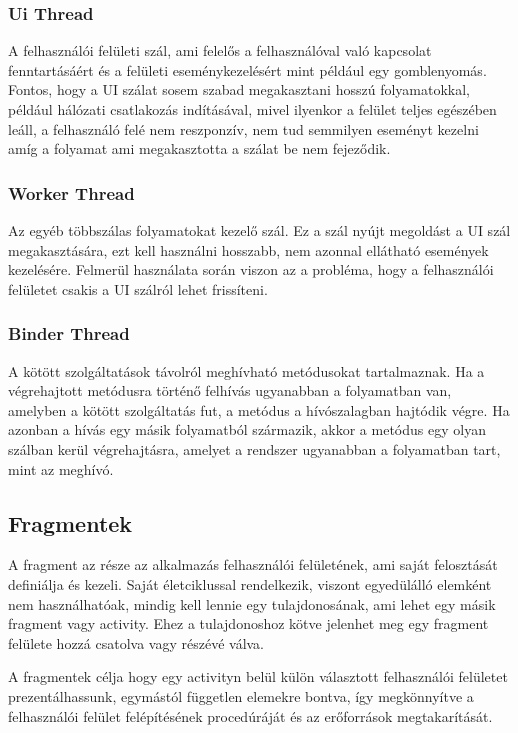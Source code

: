 \documentclass[
]{thesis-ekf}
\theoremstyle{definition}
\theoremstyle{remark}
\begin{document}
\subsubsection{Ui Thread}
A felhasználói felületi szál, ami felelős a felhasználóval való kapcsolat fenntartásáért 
és a felületi eseménykezelésért mint például egy gomblenyomás. Fontos, 
hogy a UI szálat sosem szabad megakasztani hosszú folyamatokkal, 
például hálózati csatlakozás indításával, mivel ilyenkor a felület teljes egészében leáll, 
a felhasználó felé nem reszponzív, nem tud semmilyen eseményt kezelni 
amíg a folyamat ami megakasztotta a szálat be nem fejeződik.
	
\subsubsection{Worker Thread}
Az egyéb többszálas folyamatokat kezelő szál. Ez a szál nyújt megoldást a UI szál megakasztására,
ezt kell használni hosszabb, nem azonnal ellátható események kezelésére. Felmerül használata során viszon az a
probléma, hogy a felhasználói felületet csakis a UI szálról lehet frissíteni. 
	
\subsubsection{Binder Thread}
A kötött szolgáltatások távolról meghívható metódusokat tartalmaznak. Ha a végrehajtott metódusra történő felhívás ugyanabban a folyamatban van, amelyben a kötött szolgáltatás fut, a metódus a hívószalagban hajtódik végre. Ha azonban a hívás egy másik folyamatból származik, akkor a metódus egy olyan szálban kerül végrehajtásra, amelyet a rendszer ugyanabban a folyamatban tart, mint az meghívó.

\subsection{Fragmentek}
A fragment az része az alkalmazás felhasználói felületének, ami saját felosztását definiálja és kezeli. Saját életciklussal
rendelkezik, viszont egyedülálló elemként nem használhatóak, mindig kell lennie egy tulajdonosának, ami lehet egy másik
fragment vagy activity. Ehez a tulajdonoshoz kötve jelenhet meg egy fragment felülete hozzá csatolva vagy részévé válva.

A fragmentek célja hogy egy activityn belül külön választott felhasználói felületet prezentálhassunk, egymástól független
elemekre bontva, így megkönnyítve a felhasználói felület felépítésének procedúráját és az erőforrások megtakarítását.
\end{document}
